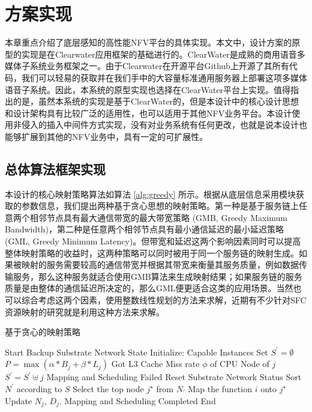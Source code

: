 \chapter{方案实现}
\label{chapter:implement}
本章重点介绍了底层感知的高性能NFV平台的具体实现。本文中，设计方案的原型的实现是在Clearwater应用框架的基础进行的。ClearWater是成熟的商用语音多媒体子系统业务框架之一。由于Clearwater在开源平台Github上开源了其所有代码，我们可以轻易的获取并在我们手中的大容量标准通用服务器上部署这项多媒体语音子系统。因此，本系统的原型实现也选择在ClearWater平台上实现。值得指出的是，虽然本系统的实现是基于ClearWater的，但是本设计中的核心设计思想和设计架构具有比较广泛的适用性，也可以适用于其他NFV业务平台。本设计使用非侵入的插入中间件方式实现，没有对业务系统有任何更改，也就是说本设计也能够扩展到其他的NFV业务中，具有一定的可扩展性。
\section{总体算法框架实现}
本设计的核心映射策略算法如算法 \ref{alg:greedy} 所示。根据从底层信息采用模块获取的参数信息，我们提出两种基于贪心思想的映射策略。第一种是基于服务链上任意两个相邻节点具有最大通信带宽的最大带宽策略 (GMB, Greedy Maximum Bandwidth)，第二种是任意两个相邻节点具有最小通信延迟的最小延迟策略 (GML, Greedy Minimum Latency)。但带宽和延迟这两个影响因素同时可以提高整体映射策略的收益时，这两种策略可以同时被用于同一个服务链的映射生成。如果被映射的服务需要较高的通信带宽并根据其带宽来衡量其服务质量，例如数据传输服务，那么这种服务就适合使用GMB算法来生成映射结果；如果服务链的服务质量是由整体的通信延迟所决定的，那么GML便更适合这类的应用场景。当然也可以综合考虑这两个因素，使用整数线性规划的方法来求解，近期有不少针对SFC资源映射的研究就是利用这种方法来求解。
\begin{algorithm} 
	\caption{基于贪心的映射策略}  
	\label{alg:greedy}  
	\begin{algorithmic} [1]
		\State Start
		\State Backup Substrate Network State
		\State Initialize: Capable Instances Set $S^{\prime} = \emptyset$
		\State	$P = \max(\alpha*B_{j} + \beta*L_{j})$
		\State Got L3 Cache Miss rate $\phi$ of CPU Node of $j$
		\State $S^{\prime} = S^{\prime}\uplus j $
		\EndIf			
		\EndFor					
		\State Mapping and Scheduling Failed
		\State Reset Substrate Network Status
		\Return
		\EndIf
		\State Sort $N^{\prime}$ according to $S$	
		\State Select the top node $j^{\star}$ from $N_{\prime}$
		\State Map the function $i$ onto  $j^{\star}$
		\State Update $N_{j}$, $D_{j}$.
		\EndFor
		\State Mapping and Scheduling Completed
		\State End
	\end{algorithmic}  
\end{algorithm} 
